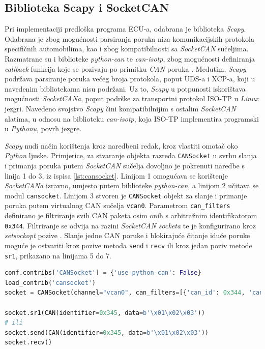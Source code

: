 \documentclass[times, utf8, diplomski, numeric]{fer}
\begin{document}
\subsection{Biblioteka Scapy i SocketCAN}
Pri implementaciji predloška programa ECU-a, odabrana je biblioteka \textit{Scapy}\cite{scapy}. Odabrana je zbog mogućnosti parsiranja poruka niza komunikacijskih protokola specifičnih automobilima, kao i zbog kompatibilnosti sa \textit{SocketCAN} sučeljima. Razmatrane su i biblioteke \textit{python-can} te \textit{can-isotp}, zbog mogućnosti definiranja \textit{callback} funkcija koje se pozivaju po primitku \textit{CAN} poruka \cite{pythoncan,canisotp}. Međutim, \textit{Scapy} podržava parsiranje poruka većeg broja protokola, poput UDS-a i XCP-a, koji u navedenim bibliotekama nisu podržani. Uz to, \textit{Scapy} u potpunosti iskorištava mogućnosti \textit{SocketCANa}, poput podrške za transportni protokol ISO-TP u \textit{Linux} jezgri. Navedeno svojstvo \textit{Scapy} čini kompatibilnijim s ostalim \textit{SocketCAN} alatima, u odnosu na biblioteku \textit{can-isotp}, koja ISO-TP implementira programski u \textit{Pythonu}, povrh jezgre.

\textit{Scapy} nudi način korištenja kroz naredbeni redak, kroz vlastiti omotač oko \textit{Python} ljuske. Primjerice, za stvaranje objekta razreda \texttt{CANSocket} u svrhu slanja i primanja poruka putem \textit{SocketCAN} sučelja dovoljno je pokrenuti naredbe s linija 1 do 3, iz ispisa \ref{lst:cansocket}. Linijom 1 omogućava se korištenje \textit{SocketCANa} izravno, umjesto putem biblioteke \textit{python-can}, a linijom 2 učitava se modul \texttt{cansocket}. Linijom 3 stvoren je \texttt{CANSocket} objekt za slanje i primanje poruka putem virtualnog CAN sučelja \texttt{vcan0}. Parametrom \texttt{can\_filters} definirano je filtriranje svih CAN paketa osim onih s arbitražnim identifikatorom \texttt{0x344}. Filtriranje se odvija na razini \textit{SocketCAN socketa} te je konfigurirano kroz \textit{setsockopt} pozive \cite{socketcan}. Slanje jedne CAN poruke i blokirajuće čitanje iduće poruke moguće je ostvariti kroz pozive metoda \texttt{send} i \texttt{recv} ili kroz jedan poziv metode \texttt{sr1}, prikazano na linijama 5 do 7.   
\newpage
\begin{lstlisting}[language=Python, label={lst:cansocket},caption={Korištenje \textit{SocketCAN} sučelja iz ljuske alata \textit{Scapy}}]
conf.contribs['CANSocket'] = {'use-python-can': False}
load_contrib('cansocket')
socket = CANSocket(channel="vcan0", can_filters=[{'can_id': 0x344, 'can_mask': 0x7FF}])

socket.sr1(CAN(identifier=0x345, data=b'\x01\x02\x03'))
# ili
socket.send(CAN(identifier=0x345, data=b'\x01\x02\x03'))
socket.recv()
\end{lstlisting}
\end{document}
